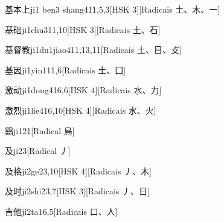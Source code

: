 \begin{entry}{基本上}{ji1 ben3 shang4}{11,5,3}[HSK 3][Radicais ⼟、⽊、⼀]
\end{entry}

\begin{entry}{基础}{ji1chu3}{11,10}[HSK 3][Radicais ⼟、⽯]
\end{entry}

\begin{entry}{基督教}{ji1du1jiao4}{11,13,11}[Radicais ⼟、⽬、⽁]
\end{entry}

\begin{entry}{基因}{ji1yin1}{11,6}[Radicais ⼟、⼞]
\end{entry}

\begin{entry}{激动}{ji1dong4}{16,6}[HSK 4][Radicais ⽔、⼒]
\end{entry}

\begin{entry}{激烈}{ji1lie4}{16,10}[HSK 4][Radicais ⽔、⽕]
\end{entry}

\begin{entry}{鷄}{ji1}{21}[Radical ⿃]
\end{entry}

\begin{entry}{及}{ji2}{3}[Radical ⼃]
\end{entry}

\begin{entry}{及格}{ji2ge2}{3,10}[HSK 4][Radicais ⼃、⽊]
\end{entry}

\begin{entry}{及时}{ji2shi2}{3,7}[HSK 3][Radicais ⼃、⽇]
\end{entry}

\begin{entry}{吉他}{ji2ta1}{6,5}[Radicais ⼝、⼈]
\end{entry}

